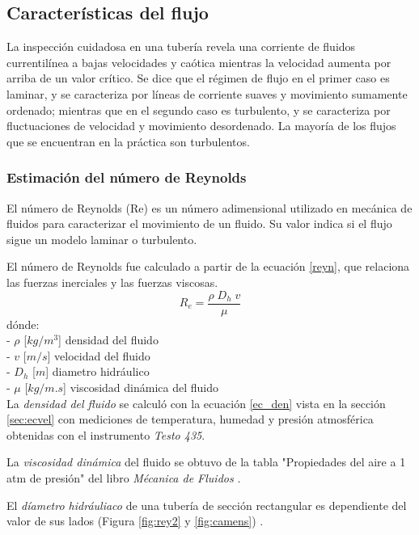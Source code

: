 \subsection{Características del flujo}
La inspección cuidadosa en una tubería revela una corriente de fluidos currentilínea a bajas velocidades y caótica mientras la velocidad aumenta por arriba de un valor crítico. Se dice que el régimen de flujo en el primer caso es laminar, y se caracteriza por líneas de corriente suaves y movimiento sumamente
ordenado; mientras que en el segundo caso es turbulento, y se caracteriza por
fluctuaciones de velocidad y movimiento  desordenado. La mayoría de los flujos que se encuentran en la
práctica son turbulentos. 

\subsubsection{Estimación del número de Reynolds}
\begin{tcolorbox}[colback=blue!5!white,colframe=blue!75!black,title=Número de Reynolds]
	El número de Reynolds (Re) es un número adimensional utilizado en mecánica de fluidos para caracterizar el movimiento de un fluido. Su valor indica si el flujo sigue un modelo laminar o turbulento.
\end{tcolorbox}
El número de Reynolds fue calculado a partir de la ecuación \ref{reyn}, que relaciona las fuerzas inerciales y las fuerzas viscosas. 
\begin{equation}	
	R_e=\frac{\rho\;D_h\;v}\mu
	\label{reyn}
\end{equation}	
dónde:\\
- \textbf{$\rho$ } [$kg/m^{3}$] densidad del fluido \\
- \textbf{$v$ } [$m/s$] velocidad del fluido\\
- \textbf{$D_h$ } [$m$] diametro hidráulico\\
- \textbf{$\mu$ } [$kg/m.s$] viscosidad dinámica del fluido\\

La \textit{densidad del fluido} se calculó con la ecuación \ref{ec_den} vista en la sección \ref{sec:ecvel} con mediciones de temperatura, humedad y presión atmosférica obtenidas con el instrumento \textit{Testo 435}.

La \textit{viscosidad dinámica} del fluido se obtuvo de la tabla "Propiedades del aire a 1 atm de presión" { }del libro \textit{Mécanica de Fluidos} \cite{yunus2006mecanica}.

El \textit{díametro hidráuliaco} de una tubería de sección rectangular es dependiente del valor de sus lados (Figura \ref{fig:rey2} y \ref{fig:camens}) \cite{licci2020estudio}.

